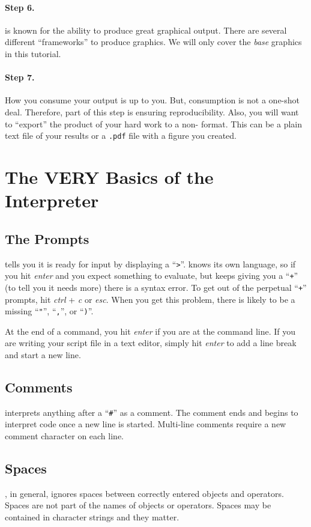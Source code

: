 \paragraph{Step 6.} \R{} is known for the ability to produce great
graphical output. There are several different ``frameworks'' to
produce graphics. We will only cover the \textit{base} graphics in
this tutorial.

\paragraph{Step 7.} How you consume your output is up to you. But,
consumption is not a one-shot deal. Therefore, part of this step is
ensuring reproducibility. Also, you will want to ``export'' the
product of your hard work to a non-\R{} format. This can be a plain
text file of your results or a \texttt{.pdf} file with a figure you
created.

\section{The VERY Basics of the \R{} Interpreter}

\subsection{The Prompts}
\R{} tells you it is ready for input by displaying a
``\texttt{>}''. \R{} knows its own language, so if you hit
\textit{enter} and you expect something to evaluate, but \R{} keeps
giving you a ``\texttt{+}'' (to tell you it needs more) there is a
syntax error. To get out of the perpetual ``\texttt{+}'' prompts, hit
\textit{ctrl} + \textit{c} or \textit{esc}. When you get this problem,
there is likely to be a missing ``\verb="='', ``\verb=,='', or
``\verb=)=''.

At the end of a command, you hit \textit{enter} if you are at the
command line. If you are writing your script file in a text editor,
simply hit \textit{enter} to add a line break and start a new line.

\subsection{Comments}
\R{} interprets anything after a ``\texttt{\#}'' as a comment. The
comment ends and \R{} begins to interpret code once a new line is
started. Multi-line comments require a new comment character on each
line.

\subsection{Spaces}
\R{}, in general, ignores spaces between correctly entered objects and
operators. Spaces are not part of the names of objects or
operators. Spaces may be contained in character strings and they
matter.


